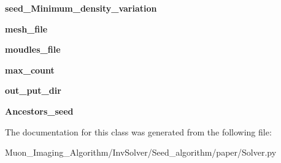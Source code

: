 \begin{DoxyCompactItemize}
\mbox{\label{classSolver_1_1Solver_a2efe2d9281873f4507754eb0bbb0ba7e}} 
{\bfseries seed\+\_\+\+Minimum\+\_\+density\+\_\+variation}
\item 
\mbox{\label{classSolver_1_1Solver_a711ae2b8995b98db9062d68f640c3747}} 
{\bfseries mesh\+\_\+file}
\item 
\mbox{\label{classSolver_1_1Solver_aac039aa0d032c02be40c951a830168b0}} 
{\bfseries moudles\+\_\+file}
\item 
\mbox{\label{classSolver_1_1Solver_a1808a1fc047b77019389c53f4f2d817a}} 
{\bfseries max\+\_\+count}
\item 
\mbox{\label{classSolver_1_1Solver_af86a252660108df8487fcc6296b16f78}} 
{\bfseries out\+\_\+put\+\_\+dir}
\item 
\mbox{\label{classSolver_1_1Solver_aedd49f889e824746d2e32c2142509c4f}} 
{\bfseries Ancestors\+\_\+seed}
\end{DoxyCompactItemize}


The documentation for this class was generated from the following file\+:\begin{DoxyCompactItemize}
\item 
Muon\+\_\+\+Imaging\+\_\+\+Algorithm/\+Inv\+Solver/\+Seed\+\_\+algorithm/paper/Solver.\+py\end{DoxyCompactItemize}
